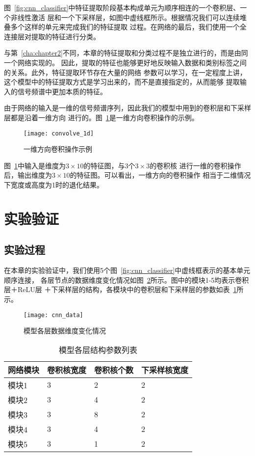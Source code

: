 图~\ref{fig:cnn_classifier}中特征提取阶段基本构成单元为顺序相连的一个卷积层、一个非线性激活
层和一个下采样层，如图中虚线框所示。根据情况我们可以连续堆叠多个这样的单元来完成我们的特征提取
过程。在网络的最后，我们使用一个全连接层对提取的特征进行分类。

与第~\ref{cha:chapter2}不同，本章的特征提取和分类过程不是独立进行的，而是由同一个网络实现的。
因此，提取的特征也能够更好地反映输入数据和类别标签之间的关系。此外，特征提取环节存在大量的网络
参数可以学习，在一定程度上讲，这个模型中的特征提取方式是学习出来的，而不是直接指定的，从而能够
提取输入的信号频谱中更加本质的特征。

由于网络的输入是一维的信号频谱序列，因此我们的模型中用到的卷积层和下采样层都是沿着一维方向
进行的。图~\ref{fig:convolve_1d}是一维方向卷积操作的示例。
\begin{figure}[ht]
  \centering%
  \texttt{[image: convolve\_1d]}
  \caption{一维方向卷积操作示例}
  \label{fig:convolve_1d}
\end{figure}

图~\ref{fig:convolve_1d}中输入是维度为$3\times10$的特征图，与3个$3\times 3$的卷积核
进行一维的卷积操作后，输出维度为$3\times 10$的特征图。可以看出，一维方向的卷积操作
相当于二维情况下宽度或高度为1时的退化结果。

\section{实验验证}

\subsection{实验过程}

在本章的实验验证中，我们使用5个图~\ref{fig:cnn_classifier}中虚线框表示的基本单元顺序连接，
各层节点的数据维度变化情况如图~\ref{fig:cnn_data}所示。图中的模块1-5均表示卷积层＋ReLU层
＋下采样层的结构，各模块中的卷积层和下采样层的参数如表~\ref{tab:layer_parameters}所示。
\begin{figure}[ht]
  \centering%
  \texttt{[image: cnn\_data]}
  \caption{模型各层数据维度变化情况}
  \label{fig:cnn_data}
\end{figure}

\begin{table}[htb]
  \centering
  \begin{minipage}[t]{0.8\linewidth} %
  \caption{模型各层结构参数列表}
  \label{tab:layer_parameters}
    \begin{tabularx}{\linewidth}{lXXX}
      \toprule[1.5pt]
      网络模块 & 卷积核宽度 & 卷积核个数 & 下采样核宽度 \\\midrule[1pt]
      模块1 & 3 & 2 & 2 \\
      模块2 & 3 & 4 & 2 \\
      模块3 & 3 & 8 & 2 \\
      模块4 & 3 & 4 & 2 \\
      模块5 & 3 & 1 & 2 \\
      \bottomrule[1.5pt]
    \end{tabularx}
  \end{minipage}
\end{table}

